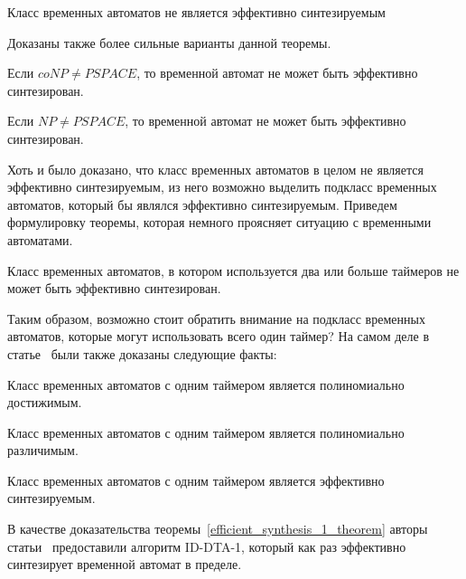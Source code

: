 \documentclass[times,specification,annotation]{itmo-student-thesis}
\begin{document}
\begin{theorem}
    Класс временных автоматов не является эффективно синтезируемым
  \label{efficient_synthesis_theorem}
\end{theorem}

Доказаны также более сильные варианты данной теоремы.

\begin{theorem}
  Если $coNP \neq PSPACE$, то временной автомат не может быть эффективно синтезирован.
  \label{coNPneqPSPACE_lemma}
\end{theorem}

\begin{theorem}
  Если $NP \neq PSPACE$, то временной автомат не может быть эффективно синтезирован.
  \label{NPneqPSPACE_lemma}
\end{theorem}

Хоть и было доказано, что класс временных автоматов в целом не является эффективно синтезируемым, из него возможно выделить подкласс временных автоматов, 
который бы являлся эффективно синтезируемым. Приведем формулировку теоремы, которая немного проясняет ситуацию с временными автоматами.

\begin{theorem}
  Класс временных автоматов, в котором используется два или больше таймеров не может быть эффективно синтезирован.
  \label{two_or_more_timers_lemma}
\end{theorem}

Таким образом, возможно стоит обратить внимание на подкласс временных автоматов, которые могут использовать всего один таймер? 
На самом деле в статье~\cite{1-dta} были также доказаны следующие факты:

\begin{lemma}
  Класс временных автоматов с одним таймером является полиномиально достижимым.
  \label{reachability_1_lemma}
\end{lemma}

\begin{lemma}
  Класс временных автоматов с одним таймером является полиномиально различимым.
  \label{distinguishability_1_lemma}
\end{lemma}

\begin{theorem}
  Класс временных автоматов с одним таймером является эффективно синтезируемым.
  \label{efficient_synthesis_1_theorem}
\end{theorem}

В качестве доказательства теоремы~\ref{efficient_synthesis_1_theorem} авторы статьи~\cite{1-dta} предоставили алгоритм ID-DTA-1, который как раз эффективно синтезирует временной автомат в пределе.
\end{document}
